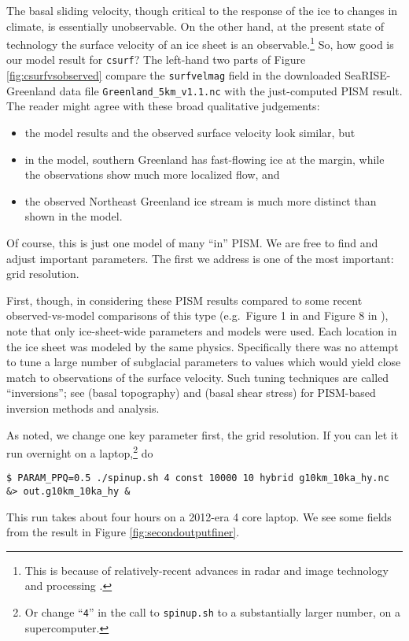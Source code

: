 The basal sliding velocity, though critical to the response of the ice to changes in climate, is essentially unobservable.  On the other hand, at the present state of technology the surface velocity of an ice sheet is an observable.\footnote{This is because of relatively-recent advances in radar and image technology and processing \cite{Joughin2002}.}  So, how good is our model result for \texttt{csurf}?  The left-hand two parts of Figure \ref{fig:csurfvsobserved} compare the \texttt{surfvelmag} field in the downloaded SeaRISE-Greenland data file \texttt{Greenland_5km_v1.1.nc} with the just-computed PISM result.  The reader might agree with these broad qualitative judgements:
\begin{itemize}
\item the model results and the observed surface velocity look similar, but
\item in the model, southern Greenland has fast-flowing ice at the margin, while the observations show much more localized flow, and
\item the observed Northeast Greenland ice stream is much more distinct than shown in the model.
\end{itemize}
Of course, this is just one model of many ``in'' PISM.  We are free to find and adjust important parameters.  The first we address is one of the most important: grid resolution.

First, though, in considering these PISM results compared to some recent observed-vs-model comparisons of this type (e.g.~Figure 1 in \cite{Priceetal2011} and Figure 8 in \cite{Larouretal2012}), note that only ice-sheet-wide parameters and models were used.  Each location in the ice sheet was modeled by the same physics.  Specifically there was no attempt to tune a large number of subglacial parameters to values which would yield close match to observations of the surface velocity.  Such tuning techniques are called ``inversions''; see \cite{vanPeltetal2013} (basal topography) and \cite{Habermannetal2013} (basal shear stress) for PISM-based inversion methods and analysis.

As noted, we change one key parameter first, the grid resolution.  If you can let it run overnight on a laptop,\footnote{Or change ``\texttt{4}'' in the call to \texttt{spinup.sh} to a substantially larger number, on a supercomputer.} do
\begin{verbatim}
$ PARAM_PPQ=0.5 ./spinup.sh 4 const 10000 10 hybrid g10km_10ka_hy.nc &> out.g10km_10ka_hy &
\end{verbatim}
This run takes about four hours on a 2012-era 4 core laptop.  We see some fields from the result in Figure \ref{fig:secondoutputfiner}.

